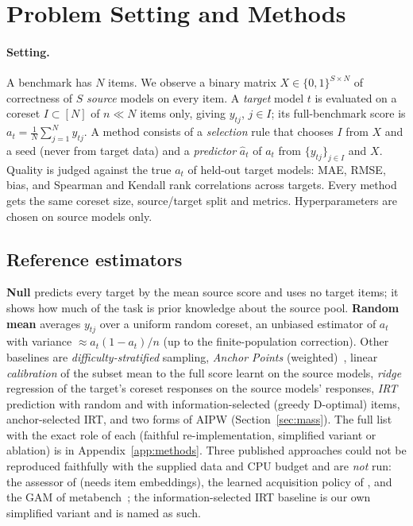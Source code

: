 \section{Problem Setting and Methods}
\label{sec:method}

\paragraph{Setting.}
A benchmark has $N$ items. We observe a binary matrix $X\in\{0,1\}^{S\times N}$ of correctness of $S$ \emph{source} models on every item.
A \emph{target} model $t$ is evaluated on a coreset $I\subset[N]$ of $n\ll N$ items only, giving $y_{tj}$, $j\in I$; its full-benchmark score is $a_t=\frac1N\sum_{j=1}^N y_{tj}$.
A method consists of a \emph{selection} rule that chooses $I$ from $X$ and a seed (never from target data) and a \emph{predictor} $\hat a_t$ of $a_t$ from $\{y_{tj}\}_{j\in I}$ and $X$.
Quality is judged against the true $a_t$ of held-out target models: MAE, RMSE, bias, and Spearman and Kendall rank correlations across targets.
Every method gets the same coreset size, source/target split and metrics. Hyperparameters are chosen on source models only.

\subsection{Reference estimators}
\label{sec:baselines}
\textbf{Null} predicts every target by the mean source score and uses no target items; it shows how much of the task is prior knowledge about the source pool.
\textbf{Random mean} averages $y_{tj}$ over a uniform random coreset, an unbiased estimator of $a_t$ with variance $\approx a_t(1-a_t)/n$ (up to the finite-population correction).
Other baselines are \emph{difficulty-stratified} sampling, \emph{Anchor Points} (weighted)~\citep{vivek2024anchor}, linear \emph{calibration} of the subset mean to the full score learnt on the source models, \emph{ridge} regression of the target's coreset responses on the source models' responses, \emph{IRT} prediction with random and with information-selected (greedy D-optimal) items, anchor-selected IRT, and two forms of AIPW (Section~\ref{sec:mass}).
The full list with the exact role of each (faithful re-implementation, simplified variant or ablation) is in Appendix~\ref{app:methods}.
Three published approaches could not be reproduced faithfully with the supplied data and CPU budget and are \emph{not} run: the assessor of \citet{pacchiardi2024100} (needs item embeddings), the learned acquisition policy of \citet{li2025active}, and the GAM of metabench~\citep{kipnis2025metabench}; the information-selected IRT baseline is our own simplified variant and is named as such.

